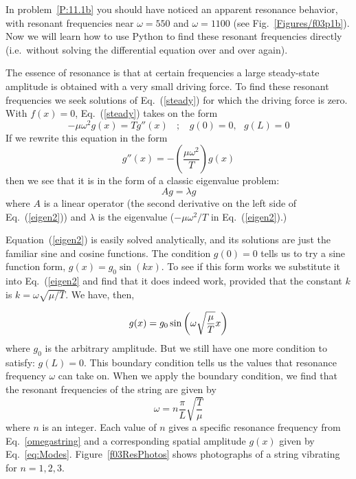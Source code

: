 In problem~\ref{P:11.1b} you should have noticed an apparent
resonance behavior, with resonant frequencies near $\omega=550$ and
$\omega=1100$ (see Fig.~\ref{Figures/f03p1b}). Now we will learn how to use
Python to find these resonant frequencies directly (i.e.~without
solving the differential equation over and over again).


The essence of resonance is that at certain frequencies a large
steady-state amplitude is obtained with a very small driving force.
To find these resonant frequencies we seek solutions of
Eq.~(\ref{steady}) for which the driving force is zero. With
$f(x)=0$, Eq.~(\ref{steady}) takes on the form
\begin{equation}
    -\mu \omega^2 g(x)=  T  g''(x)  ~~~~;~~~~
    g(0)=0,~~~g(L)=0
    \label{eigen}
\end{equation}
If we rewrite this equation in the form
\begin{equation}
    g''(x) = -\left( \frac{\mu \omega^2}{T} \right) g(x)
    \label{eigen2}
\end{equation}
then we see that it is in the form of a classic eigenvalue problem:
\begin{equation}
    A g = \lambda g
    \label{simpleig}
\end{equation}
where $A$ is a linear operator (the second derivative on the left
side of Eq.~(\ref{eigen2})) and $\lambda$ is the eigenvalue
($-\mu \omega^2/T$ in Eq.~(\ref{eigen2}).)


Equation~(\ref{eigen2}) is easily solved analytically, and its
solutions are just the familiar sine and cosine functions. The
condition $g(0)=0$ tells us to try a sine function form,
$g(x)=g_0 \sin (kx)$. To see if this form works we substitute it
into Eq.~(\ref{eigen2} and find that it does indeed work,
provided that the constant $k$ is $k=\omega \sqrt{\mu / T}$. We
have, then,


\begin{equation}\label{eq:Modes}
    g(x)=g_0 \sin{\left( \omega \sqrt{\mu \over T} x \right) }
\end{equation}
where $g_0$ is the arbitrary amplitude. But we still have one more
condition to satisfy: $g(L)=0$. This boundary condition tells us the
values that resonance frequency $\omega$ can take on.  When we apply
the boundary condition, we find that the resonant frequencies of the
string are given by
\begin{equation}\label{omegastring}
    \omega = n \frac{\pi}{L} \sqrt{ \frac{T}{\mu}}
\end{equation}
where $n$ is an integer.  Each value of $n$ gives a specific
resonance frequency from Eq.~\eqref{omegastring} and a
corresponding spatial amplitude $g(x)$ given by
Eq.~\eqref{eq:Modes}. Figure~\ref{f03ResPhotos} shows photographs
of a string vibrating for $n=1,2,3$.

